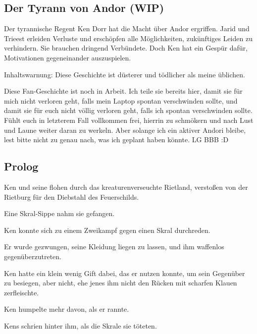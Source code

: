 \begin{chapterbox}
    \chapter{Der Tyrann von Andor (WIP)}
    \label{wip-der-tyrann-von-andor}

    Der tyrannische Regent Ken Dorr hat die Macht über Andor ergriffen. Jarid und Trieest erleiden Verluste und erschöpfen alle Möglichkeiten, zukünftiges Leiden zu verhindern. Sie brauchen dringend Verbündete. Doch Ken hat ein Gespür dafür, Motivationen gegeneinander auszuspielen.

    Inhaltswarnung: Diese Geschichte ist düsterer und tödlicher als meine üblichen. 
\end{chapterbox}



Diese Fan-Geschichte ist noch in Arbeit. Ich teile sie bereits hier, damit sie für mich nicht verloren geht, falls mein Laptop spontan verschwinden sollte, und damit sie für euch nicht völlig verloren geht, falls ich spontan verschwinden sollte. Fühlt euch in letzterem Fall vollkommen frei, hierrin zu schmökern und nach Lust und Laune weiter daran zu werkeln. Aber solange ich ein aktiver Andori bleibe, lest bitte nicht zu genau nach, was ich geplant haben könnte. LG BBB :D



\newpage
\section{Prolog}

Ken und seine  flohen durch das kreaturenverseuchte Rietland, verstoßen von der Rietburg für den Diebstahl des Feuerschilds. 

Eine Skral-Sippe nahm sie gefangen.

Ken konnte sich zu einem Zweikampf gegen einen Skral durchreden.

Er wurde gezwungen, seine Kleidung liegen zu lassen, und ihm waffenlos gegenüberzutreten.

Ken hatte ein klein wenig Gift dabei, das er nutzen konnte, um sein Gegenüber zu besiegen, aber nicht, ehe jenes ihm nicht den Rücken mit scharfen Klauen zerfleischte.

Ken humpelte mehr davon, als er rannte.

Kens  schrien hinter ihm, als die Skrale sie töteten.

